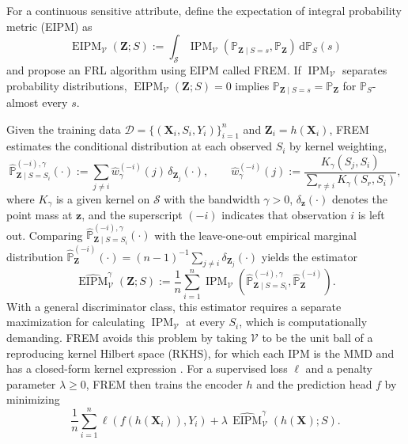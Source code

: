 \documentclass{article} %
\begin{document}
For a continuous sensitive attribute, \citet{kong2025fair} define the expectation
of integral probability metric (EIPM) as
\begin{equation}
  \operatorname{EIPM}_{\mathcal{V}}(\mathbf{Z};S)
  :=\int_{\mathcal{S}}
    \operatorname{IPM}_{\mathcal{V}}(\mathbb{P}_{\mathbf{Z}\mid S=s},\mathbb{P}_{\mathbf{Z}})
  \,\mathrm{d}\mathbb{P}_S(s)
  \label{eq:eipm}
\end{equation}
and propose an FRL algorithm using EIPM called FREM.
If $\operatorname{IPM}_{\mathcal{V}}$ separates probability distributions, $\operatorname{EIPM}_{\mathcal{V}}(\mathbf{Z};S)=0$ implies $\mathbb{P}_{\mathbf{Z}\mid S=s}=\mathbb{P}_{\mathbf{Z}}$ for $\mathbb{P}_S$-almost every $s$.

Given the training data $\mathcal{D}=\{(\mathbf{X}_i,S_i,Y_i)\}_{i=1}^n$ and $\mathbf{Z}_i=h(\mathbf{X}_i)$, FREM estimates the conditional distribution at each observed $S_i$ by kernel weighting,
\begin{equation}
  \widehat{\mathbb{P}}^{(-i),\gamma}_{\mathbf{Z}\mid S=S_i}(\cdot)
  :=\sum_{j\ne i}\widehat{w}^{(-i)}_{\gamma}(j)\,\delta_{\mathbf{Z}_j}(\cdot),
  \qquad
  \widehat{w}^{(-i)}_{\gamma}(j)
  :=\frac{K_{\gamma}(S_j,S_i)}{\sum_{r\ne i}K_{\gamma}(S_r,S_i)},
  \label{eq:frem-conditional}
\end{equation}
where $K_{\gamma}$ is a given kernel on $\mathcal{S}$ with  the bandwidth $\gamma>0$, $\delta_{\mathbf{z}}(\cdot)$ denotes the point mass at $\mathbf{z}$, and the superscript $(-i)$ indicates that observation $i$ is left out.  Comparing $\widehat{\mathbb{P}}^{(-i),\gamma}_{\mathbf{Z}\mid S=S_i}(\cdot)$ with the leave-one-out empirical marginal distribution $\widehat{\mathbb{P}}^{(-i)}_{\mathbf{Z}}(\cdot)=(n-1)^{-1}\sum_{j\ne i}\delta_{\mathbf{Z}_j}(\cdot)$ yields the estimator
\begin{equation}
  \widehat{\operatorname{EIPM}}^{\gamma}_{\mathcal{V}}(\mathbf{Z};S)
  :=\frac{1}{n}\sum_{i=1}^n
  \operatorname{IPM}_{\mathcal{V}}
  \left(\widehat{\mathbb{P}}^{(-i),\gamma}_{\mathbf{Z}\mid S=S_i},
        \widehat{\mathbb{P}}^{(-i)}_{\mathbf{Z}}\right).
  \label{eq:eipm-estimator}
\end{equation}
With a general discriminator class, this estimator requires a separate maximization for calculating $\operatorname{IPM}_{\mathcal{V}}$ at every $S_i$, which is computationally demanding.
FREM avoids this problem by taking $\mathcal{V}$ to be the unit ball of a reproducing kernel Hilbert space (RKHS), for which each IPM is the MMD and has a closed-form kernel expression \citep{gretton2012kernel,kong2025fair}.  
For a supervised loss $\ell$ and a penalty parameter $\lambda\ge 0$, FREM then trains the encoder $h$ and the prediction head $f$ by minimizing
\begin{equation}
  \frac{1}{n}\sum_{i=1}^n \ell\!\left(f(h(\mathbf{X}_i)),Y_i\right)
  +\lambda\,\widehat{\operatorname{EIPM}}^{\gamma}_{\mathcal{V}}(h(\mathbf{X});S).
  \label{eq:frem-objective}
\end{equation}
\end{document}
